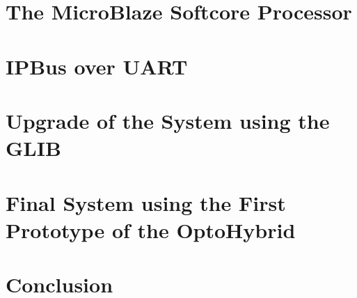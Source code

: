     \section{The MicroBlaze Softcore Processor}

    \section{IPBus over UART}

  \section{Upgrade of the System using the GLIB}

  \section{Final System using the First Prototype of the OptoHybrid}

  \section{Conclusion}

